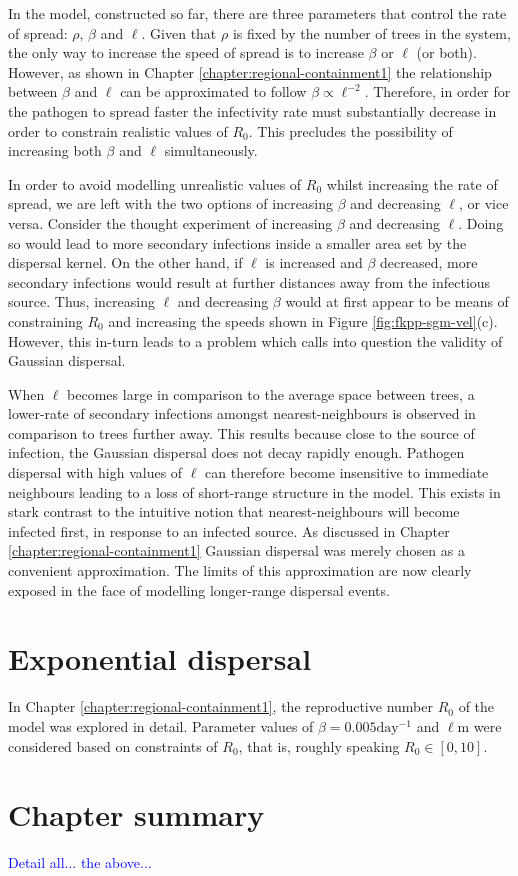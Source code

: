 In the model,  constructed so far, there are three parameters that control the rate of spread: $\rho$, $\beta$ and $\ell$. %
Given that $\rho$ is fixed by the number of trees in the system, the only way to increase the speed of spread is to increase $\beta$ or $\ell$ (or both). %
However, as shown in Chapter \ref{chapter:regional-containment1} the relationship between $\beta$ and $\ell$ can be approximated to follow $\beta \propto \ell^{-2}$. %
Therefore, in order for the pathogen to spread faster the infectivity rate must substantially decrease in order to constrain realistic values of $R_0$. This precludes the possibility of increasing both $\beta$ and $\ell$ simultaneously. %

In order to avoid modelling unrealistic values of $R_0$ whilst increasing the rate of spread, %
we are left with the two options of increasing $\beta$ and decreasing $\ell$, or vice versa. %
Consider the thought experiment of increasing $\beta$ and decreasing $\ell$. Doing so would lead to more secondary infections inside a smaller area set by the dispersal kernel. %
On the other hand, if $\ell$ is increased and $\beta$ decreased, more secondary infections would result at further distances away from the infectious source. %
Thus, increasing $\ell$ and decreasing $\beta$ would at first appear to be means of constraining $R_0$ and increasing the speeds shown in Figure \ref{fig:fkpp-sgm-vel}(c). %
However, this in-turn leads to a problem which calls into question the validity of Gaussian dispersal. %


When $\ell$ becomes large in comparison to the average space between trees, %
a lower-rate of secondary infections amongst nearest-neighbours is observed in comparison to trees further away. %
This results because close to the source of infection, the  Gaussian dispersal does not decay rapidly enough. Pathogen dispersal with high values of $\ell$ can therefore become insensitive to immediate neighbours leading to a loss of short-range structure in the model. %
This exists in stark contrast to the intuitive notion that nearest-neighbours will become infected first, in response to an infected source. %
As discussed in Chapter \ref{chapter:regional-containment1} Gaussian dispersal was merely chosen as a convenient approximation. The limits of this approximation are now clearly exposed in the face of modelling longer-range dispersal events. %

\section{Exponential dispersal}
In Chapter \ref{chapter:regional-containment1}, the reproductive number $R_0$ of the model was explored in detail. Parameter values of $\beta=0.005\mathrm{day^{-1}}$ and $\ell\mathrm{m}$ were considered based on constraints of $R_0$, that is, roughly speaking $R_0 \in [0, 10]$. 
\blindtext[1]
\blindtext[1]




\section{Chapter summary}
\blindtext[1]
\textcolor{blue}{Detail all... the above...}




